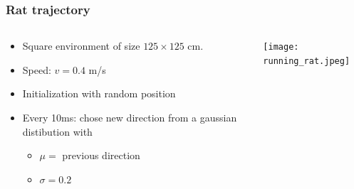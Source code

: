 \documentclass[mathserif]{beamer}
\begin{document}
%
\begin{frame}
\frametitle{Rat trajectory}
  \begin{columns}[T]
    \begin{column}{.5\textwidth}
			\begin{itemize}
		    \item Square environment of size $125 \times 125$ cm.
		    \item Speed: $v=0.4$ m/s
		    \item Initialization with random position
		    \item Every 10ms: chose new direction from a gaussian distibution with 
		    	\begin{itemize}
		    	\item $\mu=$ previous direction
		    	\item $\sigma= 0.2$
		    	\end{itemize}
		    \end{itemize}
    \end{column}
    \begin{column}{.5\textwidth}
    \texttt{[image: running\_rat.jpeg]}
    \end{column}
  \end{columns}
\end{frame}


\end{document}
